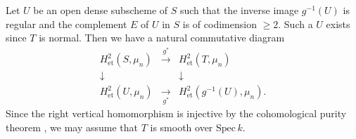 \documentclass[11pt]{amsart}
\begin{document}
{ {
Let $U$ be an open dense subscheme of $S$ such that the inverse image 
$g^{-1}(U)$ is regular and the complement $E$ of $U$ in $S$ 
is of codimension $\geq 2$. Such a $U$ exists since $T$ is normal. 
Then we have a natural commutative diagram 
$$
     \begin{array}{ccccc}
          H^2_{\mathrm{et}}(S, \mu_n) &\overset{g^\ast}{\rightarrow} &H^2_{\mathrm{et}}(T, \mu_n) \\
          \downarrow & &\downarrow \\
          H^2_{\mathrm{et}}(U, \mu_n) &\underset{g^\ast}{\rightarrow} &H^2_{\mathrm{et}}(g^{-1}(U), \mu_n). 
     \end{array}
$$
Since the right vertical homomorphism is injective by the cohomological purity theorem \cite[VI, Theorem 5.1]{mil}, 
we may assume that $T$ is smooth over $\mathrm{Spec}\, k$. 

}}
\end{document}
